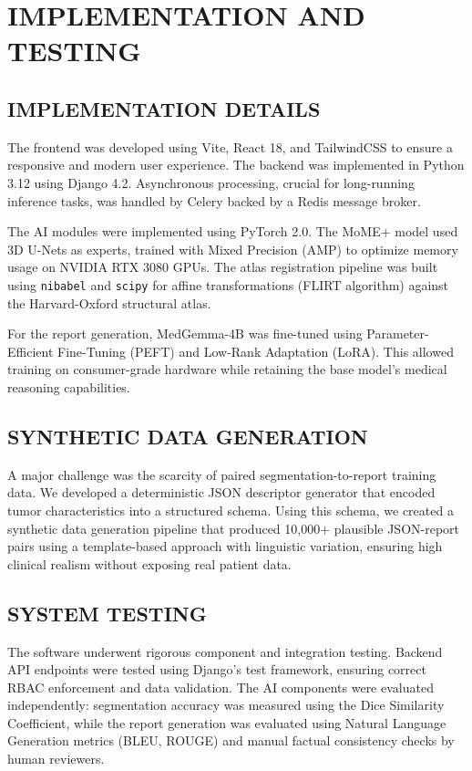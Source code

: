 \documentclass[12pt, a4paper]{report}
\begin{document}
\chapter{IMPLEMENTATION AND TESTING}

\section{IMPLEMENTATION DETAILS}
The frontend was developed using Vite, React 18, and TailwindCSS to ensure a responsive and modern user experience. The backend was implemented in Python 3.12 using Django 4.2. Asynchronous processing, crucial for long-running inference tasks, was handled by Celery backed by a Redis message broker.

The AI modules were implemented using PyTorch 2.0. The MoME+ model used 3D U-Nets as experts, trained with Mixed Precision (AMP) to optimize memory usage on NVIDIA RTX 3080 GPUs. The atlas registration pipeline was built using \texttt{nibabel} and \texttt{scipy} for affine transformations (FLIRT algorithm) against the Harvard-Oxford structural atlas. 

For the report generation, MedGemma-4B was fine-tuned using Parameter-Efficient Fine-Tuning (PEFT) and Low-Rank Adaptation (LoRA). This allowed training on consumer-grade hardware while retaining the base model's medical reasoning capabilities.

\section{SYNTHETIC DATA GENERATION}
A major challenge was the scarcity of paired segmentation-to-report training data. We developed a deterministic JSON descriptor generator that encoded tumor characteristics into a structured schema. Using this schema, we created a synthetic data generation pipeline that produced 10,000+ plausible JSON-report pairs using a template-based approach with linguistic variation, ensuring high clinical realism without exposing real patient data.

\section{SYSTEM TESTING}
The software underwent rigorous component and integration testing. Backend API endpoints were tested using Django's test framework, ensuring correct RBAC enforcement and data validation. The AI components were evaluated independently: segmentation accuracy was measured using the Dice Similarity Coefficient, while the report generation was evaluated using Natural Language Generation metrics (BLEU, ROUGE) and manual factual consistency checks by human reviewers.
\end{document}
